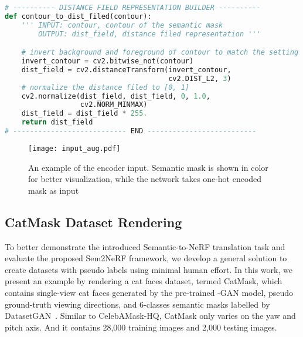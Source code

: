 \documentclass[runningheads]{llncs}
\begin{document}
\begin{lstlisting}[language=Python]
# ---------- DISTANCE FIELD REPRESENTATION BUILDER ----------
def contour_to_dist_filed(contour):
    ''' INPUT: contour, contour of the semantic mask
        OUTPUT: dist_field, distance filed representation '''

    # invert background and foreground of contour to match the setting
    invert_contour = cv2.bitwise_not(contour)
    dist_field = cv2.distanceTransform(invert_contour, 
                                       cv2.DIST_L2, 3)
    # normalize the distance filed to [0, 1]
    cv2.normalize(dist_field, dist_field, 0, 1.0, 
                  cv2.NORM_MINMAX)
    dist_field = dist_field * 255.
    return dist_field
# --------------------------- END --------------------------
\end{lstlisting}


\begin{figure}[t!]
    \centering
    \texttt{[image: input\_aug.pdf]}
\caption{An example of the encoder input. Semantic mask is shown in color for better visualization, while the network takes one-hot encoded mask as input}
\label{fig:input_aug}
\end{figure}



\subsection{CatMask Dataset Rendering} \label{sec:tech_cat}

To better demonstrate the introduced Semantic-to-NeRF translation task and evaluate the proposed Sem2NeRF framework, we develop a general solution to create datasets with pseudo labels using minimal human effort. In this work, we present an example by rendering a cat faces dataset, termed CatMask, which contains single-view cat faces generated by the pre-trained -GAN model, pseudo ground-truth viewing directions, and 6-classes semantic masks labelled by DatasetGAN~\cite{zhang2021datasetgan}. 
Similar to CelebAMask-HQ, CatMask only varies on the yaw and pitch axis. And it contains 28,000 training images and 2,000 testing images.
\end{document}
